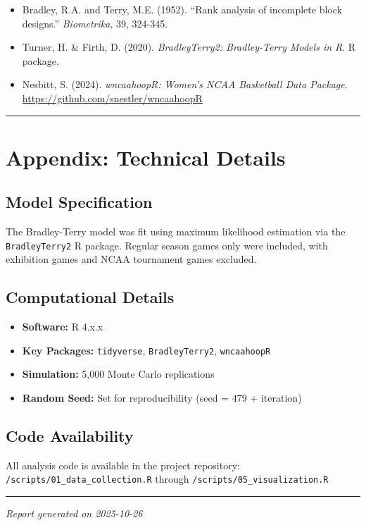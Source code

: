 \documentclass[
]{article}
\providecommand{\tightlist}{%
  \setlength{\itemsep}{0pt}\setlength{\parskip}{0pt}}
\begin{document}
\begin{itemize}
\tightlist
\item
  Bradley, R.A. and Terry, M.E. (1952). ``Rank analysis of incomplete
  block designs.'' \emph{Biometrika}, 39, 324-345.
\item
  Turner, H. \& Firth, D. (2020). \emph{BradleyTerry2: Bradley-Terry
  Models in R}. R package.
\item
  Nesbitt, S. (2024). \emph{wncaahoopR: Women's NCAA Basketball Data
  Package}. \url{https://github.com/snestler/wncaahoopR}
\end{itemize}

\begin{center}\rule{0.5\linewidth}{0.5pt}\end{center}

\section{Appendix: Technical Details}\label{appendix-technical-details}

\subsection{Model Specification}\label{model-specification}

The Bradley-Terry model was fit using maximum likelihood estimation via
the \texttt{BradleyTerry2} R package. Regular season games only were
included, with exhibition games and NCAA tournament games excluded.

\subsection{Computational Details}\label{computational-details}

\begin{itemize}
\tightlist
\item
  \textbf{Software:} R 4.x.x
\item
  \textbf{Key Packages:} \texttt{tidyverse}, \texttt{BradleyTerry2},
  \texttt{wncaahoopR}
\item
  \textbf{Simulation:} 5,000 Monte Carlo replications
\item
  \textbf{Random Seed:} Set for reproducibility (seed = 479 + iteration)
\end{itemize}

\subsection{Code Availability}\label{code-availability}

All analysis code is available in the project repository:
\texttt{/scripts/01\_data\_collection.R} through
\texttt{/scripts/05\_visualization.R}

\begin{center}\rule{0.5\linewidth}{0.5pt}\end{center}

\emph{Report generated on 2025-10-26}
\end{document}
